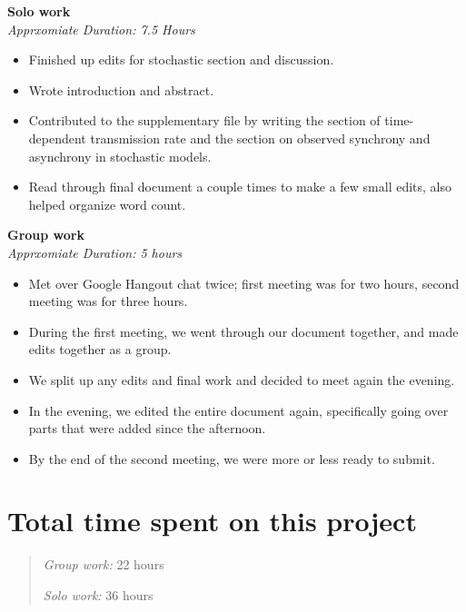 \documentclass[12pt]{article}\usepackage[]{graphicx}\usepackage[]{color}
\begin{document}
\textbf{Solo work} \\
\emph{Apprxomiate Duration: 7.5 Hours}
\begin{itemize}
\item Finished up edits for stochastic section and discussion.
\item Wrote introduction and abstract.
\item Contributed to the supplementary file by writing the section of time-dependent transmission rate and the section on observed synchrony and asynchrony in stochastic models.
\item Read through final document a couple times to make a few small edits, also helped organize word count.
\end{itemize}

\textbf{Group work} \\
\emph{Apprxomiate Duration: 5 hours}
\begin{itemize}
\item Met over Google Hangout chat twice; first meeting was for two hours, second meeting was for three hours.
\item During the first meeting, we went through our document together, and made edits together as a group.
\item We split up any edits and final work and decided to meet again the evening.
\item In the evening, we edited the entire document again, specifically going over parts that were added since the afternoon.
\item By the end of the second meeting, we were more or less ready to submit.
\end{itemize}

\section*{Total time spent on this project}

\begin{quote}

\emph{Group work:} 22 hours

\emph{Solo work:} 36 hours

\end{quote}
\end{document}
